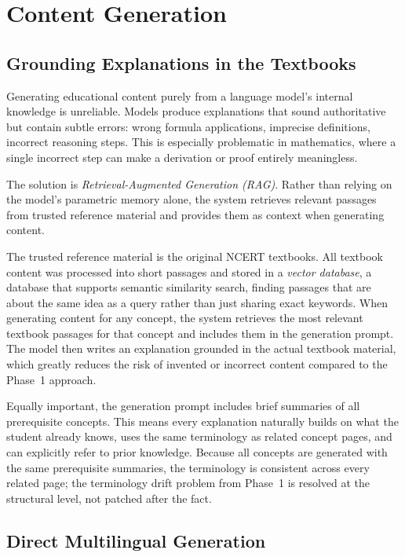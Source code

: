 \documentclass[12pt,a4paper]{article}
\begin{document}
\section{Content Generation}

\subsection{Grounding Explanations in the Textbooks}

Generating educational content purely from a language model's internal knowledge
is unreliable.
Models produce explanations that sound authoritative but contain subtle errors:
wrong formula applications, imprecise definitions, incorrect reasoning steps.
This is especially problematic in mathematics, where a single incorrect step
can make a derivation or proof entirely meaningless.

The solution is \emph{Retrieval-Augmented Generation (RAG)}.
Rather than relying on the model's parametric memory alone,
the system retrieves relevant passages from trusted reference material
and provides them as context when generating content.

The trusted reference material is the original NCERT textbooks.
All textbook content was processed into short passages and stored in a
\emph{vector database}, a database that supports semantic similarity search,
finding passages that are about the same idea as a query
rather than just sharing exact keywords.
When generating content for any concept, the system retrieves the most relevant textbook
passages for that concept and includes them in the generation prompt.
The model then writes an explanation grounded in the actual textbook material,
which greatly reduces the risk of invented or incorrect content compared to
the Phase~1 approach.

Equally important, the generation prompt includes brief summaries of all prerequisite
concepts.
This means every explanation naturally builds on what the student already knows,
uses the same terminology as related concept pages,
and can explicitly refer to prior knowledge.
Because all concepts are generated with the same prerequisite summaries,
the terminology is consistent across every related page;
the terminology drift problem from Phase~1 is resolved at the structural level,
not patched after the fact.

\subsection{Direct Multilingual Generation}
\end{document}
